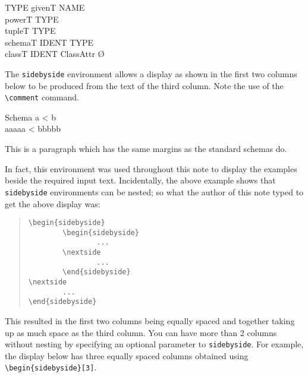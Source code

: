 \documentclass[a4paper]{article}
\begin{document}
\begin{example}
\begin{zed}
TYPE \ddef \M givenT  \lang NAME \rang \\
\bbar powerT \lang TYPE \rang \\
\bbar tupleT \lang \seq TYPE \rang \\
\bbar schemaT \lang IDENT \ffun TYPE \rang \\
\bbar classT \lang IDENT \ffun ClassAttr \rang \O
\end{zed}
\end{example}

The {\tt sidebyside} environment allows a display as shown in the
first two columns below to be produced from the text of the third column.
Note the use of the \verb|\comment| command.

\begin{example}
\begin{sidebyside}
\begin{schema}{Schema}
\ST
a < b  \\
aaaaa < bbbbb 
\end{schema}
\nextside
\begin{zpar}
This is a paragraph which has the same
margins as the standard schemas do.
\end{zpar}
\end{sidebyside}
\end{example}

In fact, this environment was used throughout this note to
display the examples beside the required input text.
Incidentally, the above example shows that \verb|sidebyside|
environments can be nested; so what the author of this note typed
to get the above display was:

\begin{quote}
\begin{verbatim}
\begin{sidebyside}
        \begin{sidebyside}
                ...
        \nextside
                ...
        \end{sidebyside}
\nextside
        ...
\end{sidebyside}
\end{verbatim}
\end{quote}

This resulted in the first two columns being equally spaced and
together taking up as much space as the third column.
You can have more than 2 columns without nesting by specifying an optional
parameter to \verb|sidebyside|.  For example, the display below has three
equally spaced columns obtained using \verb|\begin{sidebyside}[3]|.
\end{document}

